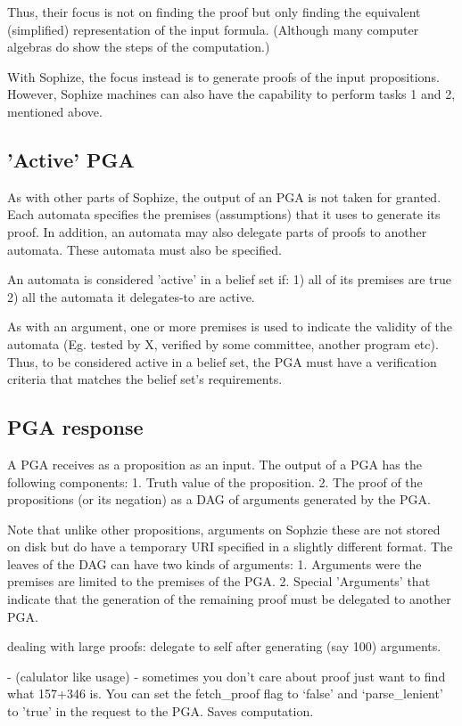 \documentclass[a4paper]{article}
\begin{document}
Thus, their focus is not on finding the proof but only finding the equivalent (simplified) representation of the input formula. (Although many computer algebras do show the steps of the computation.)

With Sophize, the focus instead is to generate proofs of the input propositions. However, Sophize machines can also have the capability to perform tasks 1 and 2, mentioned above.

\subsection{'Active' PGA}
As with other parts of Sophize, the output of an PGA is not taken for granted. Each automata specifies the premises (assumptions) that it uses to generate its proof. In addition, an automata may also delegate parts of proofs to another automata. These automata must also be specified. 

An automata is considered 'active' in a belief set if:
1) all of its premises are true
2) all the automata it delegates-to are active.

As with an argument, one or more premises is used to indicate the validity of the automata (Eg. tested by X, verified by some committee, another program etc). Thus, to be considered active in a belief set, the PGA must have a verification criteria that matches the belief set's requirements. 

\subsection{PGA response}
A PGA receives as a proposition as an input. The output of a PGA has the following components:
1. Truth value of the proposition.
2. The proof of the propositions (or its negation) as a DAG of arguments generated by the PGA. 

Note that unlike other propositions, arguments on Sophzie these are not stored on disk but do have a temporary URI specified in a slightly different format. The leaves of the DAG can have two kinds of arguments:
1. Arguments were the premises are limited to the premises of the PGA.
2. Special 'Arguments' that indicate that the generation of the remaining proof must be delegated to another PGA.

dealing with large proofs: delegate to self after generating (say 100) arguments.

- (calulator like usage) - sometimes you don't care about proof just want to find what 157+346 is. You can set the fetch\_proof flag to `false' and `parse\_lenient' to 'true' in the request to the PGA. Saves computation. 
\end{document}
